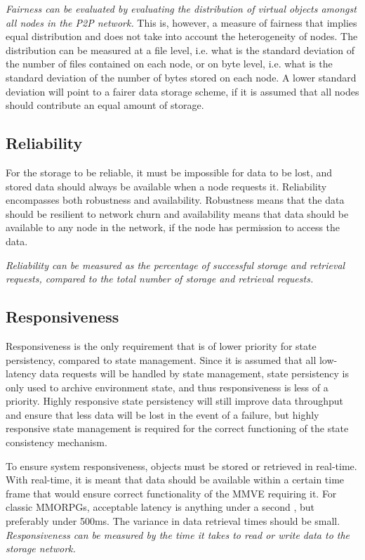 \emph{Fairness can be evaluated by evaluating the distribution of virtual objects amongst all nodes in the P2P network.} This is, however, a measure of fairness that implies equal distribution and does not take into account the heterogeneity of nodes. The distribution can be measured at a file level, i.e. what is the standard deviation of the number of files contained on each node, or on byte level, i.e. what is the standard deviation of the number of bytes stored on each node. A lower standard deviation will point to a fairer data storage scheme, if it is assumed that all nodes should contribute an equal amount of storage.

\subsection{Reliability}

For the storage to be reliable, it must be impossible for data to be lost, and stored data should always be available when a node requests it. Reliability encompasses both robustness and availability. Robustness means that the data should be resilient to network churn and availability means that data should be available to any node in the network, if the node has permission to access the data.

\emph{Reliability can be measured as the percentage of successful storage and retrieval requests, compared to the total number of storage and retrieval requests.}

\subsection{Responsiveness}
\label{char_responsiveness}

Responsiveness is the only requirement that is of lower priority for state persistency, compared to state management. Since it is assumed that all low-latency data requests will be handled by state management, state persistency is only used to archive environment state, and thus responsiveness is less of a priority. Highly responsive state persistency will still improve data throughput and ensure that less data will be lost in the event of a failure, but highly responsive state management is required for the correct functioning of the state consistency mechanism.

To ensure system responsiveness, objects must be stored or retrieved in real-time. With real-time, it is meant that data should be available within a certain time frame that would ensure correct functionality of the MMVE requiring it. For classic MMORPGs, acceptable latency is anything under a second \cite{WoW_delay_effect}, but preferably under 500ms. The variance in data retrieval times should be small. \emph{Responsiveness can be measured by the time it takes to read or write data to the storage network.}

